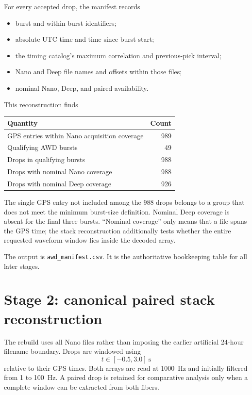 \documentclass[11pt]{article}
\newcommand{\code}[1]{\texttt{#1}}
\begin{document}
For every accepted drop, the manifest records
\begin{itemize}
    \item burst and within-burst identifiers;
    \item absolute UTC time and time since burst start;
    \item the timing catalog's maximum correlation and previous-pick interval;
    \item Nano and Deep file names and offsets within those files;
    \item nominal Nano, Deep, and paired availability.
\end{itemize}

This reconstruction finds
\begin{center}
\begin{tabular}{lr}
\toprule
Quantity & Count\\
\midrule
GPS entries within Nano acquisition coverage & 989\\
Qualifying AWD bursts & 49\\
Drops in qualifying bursts & 988\\
Drops with nominal Nano coverage & 988\\
Drops with nominal Deep coverage & 926\\
\bottomrule
\end{tabular}
\end{center}
The single GPS entry not included among the 988 drops belongs to a group that
does not meet the minimum burst-size definition.  Nominal Deep coverage is
absent for the final three bursts.  ``Nominal coverage'' only means that a file
spans the GPS time; the stack reconstruction additionally tests whether the
entire requested waveform window lies inside the decoded array.

The output is \code{awd\_manifest.csv}.  It is the authoritative bookkeeping
table for all later stages.

\section{Stage 2: canonical paired stack reconstruction}

The rebuild uses all Nano files rather than imposing the earlier artificial
24-hour filename boundary.  Drops are windowed using
\[
t\in[-0.5,3.0]~\mathrm{s}
\]
relative to their GPS times.  Both arrays are read at 1000~Hz and initially
filtered from 1 to 100~Hz.  A paired drop is retained for comparative analysis
only when a complete window can be extracted from both fibers.
\end{document}
